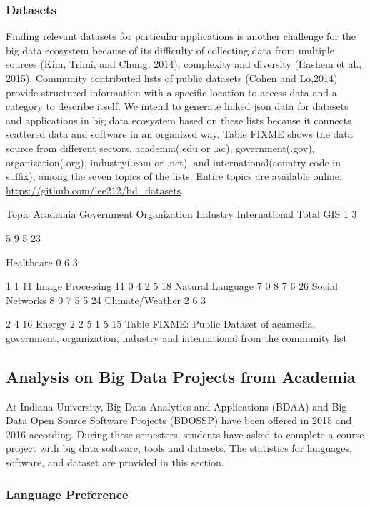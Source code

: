 \documentclass[9pt,twocolumn,twoside]{styles/osajnl}
\begin{document}
\subsubsection{Datasets }

Finding relevant datasets for particular applications is another
challenge for the big data ecosystem because of its difficulty of
collecting data from multiple sources (Kim, Trimi, and Chung, 2014),
complexity and diversity (Hashem et al., 2015). Community contributed
lists of public datasets (Cohen and Lo,2014) provide structured
information with a specific location to access data and a category to
describe itself. We intend to generate linked json data for datasets
and applications in big data ecosystem based on these lists because it
connects scattered data and software in an organized way. Table FIXME
shows the data source from different sectors, academia(.edu or .ac),
government(.gov), organization(.org), industry(.com or .net), and
international(country code in suffix), among the seven topics of the
lists. Entire topics are available online:
\url{https://github.com/lee212/bd_datasets}.


Topic
	Academia
	Government
	Organization
	Industry
	International
	Total
	GIS
	1
	3

	5
	9
	5
	23

	Healthcare
	0
	6
	3

	1
	1
	11
	Image Processing
	11
	0
	4
	2
	5
	18
	Natural Language
	7
	0
	8
	7
	6
	26
	Social Networks
	8
	0
	7
	5
	5
	24
	Climate/Weather
	2
	6
	3

	2
	4
	16
	Energy
	2
	2
	5
	1
	5
	15
	Table FIXME:  Public Dataset of acamedia, government, organization, industry and international from the community list

\subsection{Analysis on Big Data Projects from Academia}

At Indiana University, Big Data Analytics and Applications (BDAA) and Big Data Open Source Software Projects (BDOSSP) have been offered in 2015 and 2016 according. During these semesters, students have asked to complete a course project with big data software, tools and datasets. The statistics for languages, software, and dataset are provided in this section.
\subsubsection{Language Preference}
\end{document}

